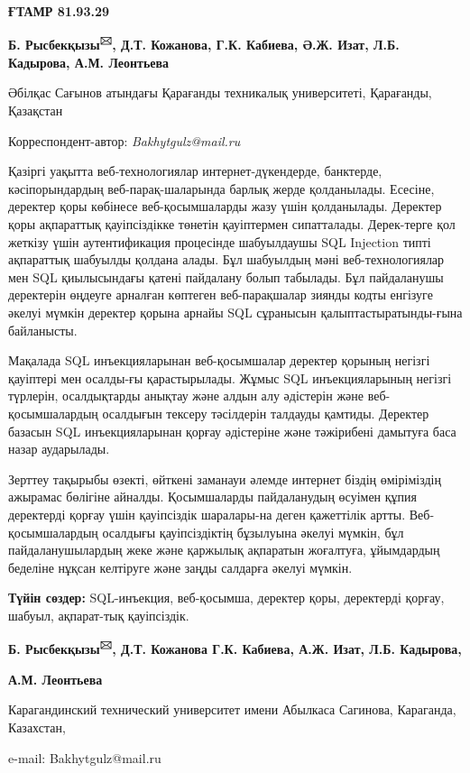 
\newpage
{\bfseries ҒТАМР 81.93.29}

\begin{center}

{\bfseries Б. Рысбекқызы\textsuperscript{🖂}, Д.Т. Кожанова, Г.К. Кабиева,
Ә.Ж. Изат, Л.Б. Кадырова, А.М. Леонтьева}

Әбілқас Сағынов атындағы Қарағанды техникалық университеті, Қарағанды,
Қазақстан
\end{center}
Корреспондент-автор: \emph{Bakhytgulz@mail.ru}


Қазіргі уақытта веб-технологиялар интернет-дүкендерде, банктерде,
кәсіпорындардың веб-парақ-шаларында барлық жерде қолданылады. Есесіне,
деректер қоры көбінесе веб-қосымшаларды жазу үшін қолданылады. Деректер
қоры ақпараттық қауіпсіздікке төнетін қауіптермен сипатталады.
Дерек-терге қол жеткізу үшін аутентификация процесінде шабуылдаушы SQL
Injection типті ақпараттық шабуылды қолдана алады. Бұл шабуылдың мәні
веб-технологиялар мен SQL қиылысындағы қатені пайдалану болып табылады.
Бұл пайдаланушы деректерін өңдеуге арналған көптеген веб-парақшалар
зиянды кодты енгізуге әкелуі мүмкін деректер қорына арнайы SQL сұранысын
қалыптастыратынды-ғына байланысты.

Мақалада SQL инъекцияларынан веб-қосымшалар деректер қорының негізгі
қауіптері мен осалды-ғы қарастырылады. Жұмыс SQL инъекцияларының негізгі
түрлерін, осалдықтарды анықтау және алдын алу әдістерін және
веб-қосымшалардың осалдығын тексеру тәсілдерін талдауды қамтиды.
Деректер базасын SQL инъекцияларынан қорғау әдістеріне және тәжірибені
дамытуға баса назар аударылады.

Зерттеу тақырыбы өзекті, өйткені заманауи әлемде интернет біздің
өміріміздің ажырамас бөлігіне айналды. Қосымшаларды пайдаланудың өсуімен
құпия деректерді қорғау үшін қауіпсіздік шаралары-на деген қажеттілік
артты. Веб-қосымшалардың осалдығы қауіпсіздіктің бұзылуына әкелуі
мүмкін, бұл пайдаланушылардың жеке және қаржылық ақпаратын жоғалтуға,
ұйымдардың беделіне нұқсан келтіруге және заңды салдарға әкелуі мүмкін.

{\bfseries Түйін сөздер:} SQL-инъекция, веб-қосымша, деректер қоры,
деректерді қорғау, шабуыл, ақпарат-тық қауіпсіздік.


\begin{center}
{\bfseries Б. Рысбекқызы\textsuperscript{🖂}, Д.Т. Кожанова Г.К. Кабиева,
А.Ж. Изат, Л.Б. Кадырова,}

{\bfseries А.М. Леонтьева}

Карагандинский технический университет имени Абылкаса Сагинова,
Караганда, Казахстан,

e-mail: Bakhytgulz@mail.ru
\end{center}

